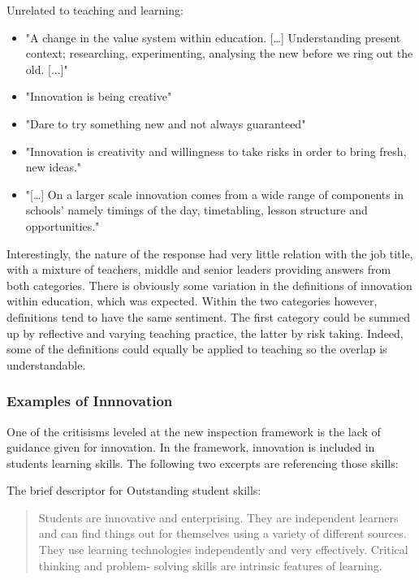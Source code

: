 Unrelated to teaching and learning:
\begin{itemize}
\item "A change in the value system within education. […] Understanding present context; researching, experimenting, analysing the new before we ring out the old. [...]"
\item "Innovation is being creative"
\item "Dare to try something new and not always guaranteed"
\item "Innovation is creativity and willingness to take risks in order to bring fresh, new ideas."
\item "[…] On a larger scale innovation comes from a wide range of components in schools' namely timings of the day, timetabling, lesson structure and opportunities."
\end{itemize}

Interestingly, the nature of the response had very little relation with the job title, with a mixture of teachers, middle and senior leaders providing answers from both categories. There is obviously some variation in the definitions of innovation within education, which was expected. Within the two categories however, definitions tend to have the same sentiment. The first category could be summed up by reflective and varying teaching practice, the latter by risk taking. Indeed, some of the definitions could equally be applied to teaching so the overlap is understandable.

\subsubsection{Examples of Innnovation}

One of the critisisms leveled at the new inspection framework is the lack of guidance given for innovation. In the framework, innovation is included in students learning skills. The following two excerpts are referencing those skills:

The brief descriptor for Outstanding student skills:
\begin{quote}
Students are innovative and enterprising. They are independent learners and can find things out for themselves using a variety of different sources. They use learning technologies independently and very effectively. Critical thinking and problem- solving skills are intrinsic features of learning.
\end{quote}

